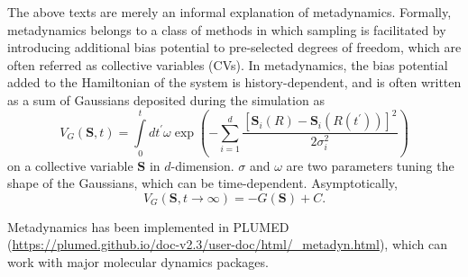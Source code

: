 
The above texts are merely an informal explanation of metadynamics. Formally, metadynamics belongs to a class of methods in which sampling is facilitated by introducing additional bias potential to pre-selected degrees of freedom, which are often referred as collective variables (CVs). In metadynamics, the bias potential added to the Hamiltonian of the system is history-dependent, and is often written as a sum of Gaussians deposited during the simulation as
\begin{equation}
   V_G(\mathbf{S},t) = \int\limits_0^tdt^\prime \omega\exp{\left(-\sum\limits_{i=1}^{d}\frac{\left[\mathbf{S}_i(R)-\mathbf{S}_i(R(t^\prime))\right]^2}{2\sigma_i^2}\right)}
\end{equation}
on a collective variable $\mathbf{S}$ in $d$-dimension. $\sigma$ and $\omega$ are two parameters tuning the shape of the Gaussians, which can be time-dependent. Asymptotically, 
\begin{equation}
   V_G(\mathbf{S},t\rightarrow \infty) = -G(\mathbf{S})+C.
\end{equation}

Metadynamics has been implemented in PLUMED (\url{https://plumed.github.io/doc-v2.3/user-doc/html/_metadyn.html}), which can work with major molecular dynamics packages.